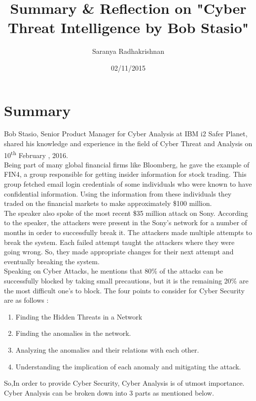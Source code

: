 \documentclass{article}
\title{Summary \& Reflection on  "Cyber Threat Intelligence by Bob Stasio"}
\author{Saranya Radhakrishnan}
\date{02/11/2015}
\begin{document}
\maketitle
\justify
\section*{Summary}

Bob Stasio, Senior Product Manager for Cyber Analysis at IBM i2 Safer Planet, shared his knowledge and experience in the field of Cyber Threat and Analysis on 10\textsuperscript{th} February , 2016. \\

Being part of many global financial firms like Bloomberg, he gave the example of FIN4, a group responsible for getting insider information for stock trading. This group fetched email login credentials of some individuals who were known to have confidential information. Using the information from these individuals they traded on the financial markets to make approximately \$100 million. \\

The speaker also spoke of the most recent \$35 million attack on Sony. According to the speaker, the attackers were present in the Sony's network for a number of months in order to successfully break it. The attackers made multiple attempts to break the system. Each failed attempt taught the attackers where they were going wrong. So, they made appropriate changes for their next attempt and eventually breaking the system. \\

Speaking on Cyber Attacks, he mentions that 80\% of the attacks can be successfully blocked by taking small precautions, but it is the remaining 20\% are the most difficult one's to block. The four points to consider for Cyber Security are as follows :
\begin{enumerate}
\item  Finding the Hidden Threats in a Network
\item Finding the anomalies in the network.
\item Analyzing the anomalies and their relations with each other.
\item Understanding the implication of each anomaly and mitigating the attack. \\
\end{enumerate} 

So,In order to provide Cyber Security, Cyber Analysis is of utmost importance. Cyber Analysis can be broken down into 3 parts as mentioned below.
\end{document}

